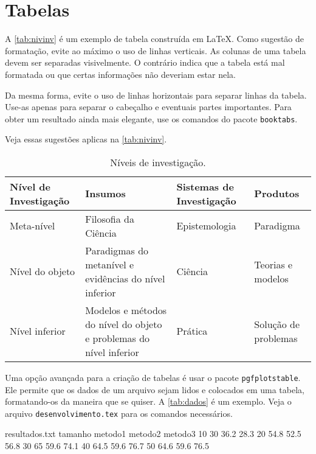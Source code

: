 \section{Tabelas}

A \autoref{tab:nivinv} é um exemplo de tabela construída em \LaTeX.
  Como sugestão de formatação, evite ao máximo o uso de linhas verticais.
  As colunas de uma tabela devem ser separadas visivelmente.
  O contrário indica que a tabela está mal formatada ou que certas informações não deveriam estar nela.

Da mesma forma, evite o uso de linhas horizontais para separar linhas da tabela.
  Use-as apenas para separar o cabeçalho e eventuais partes importantes.
  Para obter um resultado ainda mais elegante, use os comandos do pacote \texttt{booktabs}.

Veja essas sugestões aplicas na \autoref{tab:nivinv}.

\begin{table}[!htb]
\footnotesize
\caption[Níveis de investigação]{Níveis de investigação.}
\label{tab:nivinv}
\begin{tabular}{m{2.6cm}m{6.0cm}m{2.25cm}m{3.40cm}}
  \toprule
  \textbf{Nível de Investigação} & \textbf{Insumos}  & \textbf{Sistemas de Investigação}  & \textbf{Produtos}  \\
  \midrule
  Meta-nível & Filosofia\index{filosofia} da Ciência  & Epistemologia & Paradigma  \\
  Nível do objeto & Paradigmas do metanível e evidências do nível inferior & Ciência  & Teorias e modelos \\
  Nível inferior & Modelos e métodos do nível do objeto e problemas do nível inferior & Prática & Solução de problemas  \\
  \bottomrule
\end{tabular}
\end{table}


Uma opção avançada para a criação de tabelas é usar o pacote \texttt{pgfplotstable}.
  Ele permite que os dados de um arquivo sejam lidos e colocados em uma tabela, formatando-os da maneira que se quiser.
  A \autoref{tab:dados} é um exemplo.
  Veja o arquivo \texttt{desenvolvimento.tex} para os comandos necessários.

\begin{filecontents*}{resultados.txt}
tamanho metodo1 metodo2 metodo3
10  30    36.2  28.3
20  54.8  52.5  56.8
30  65    59.6  74.1
40  64.5  59.6  76.7
50  64.6  59.6  76.5
\end{filecontents*}

